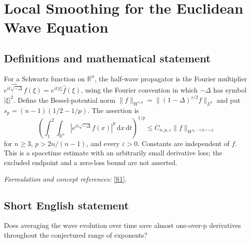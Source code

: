 \documentclass[11pt]{article}
\newcommand{\R}{\mathbb{R}}
\newcommand{\eps}{\varepsilon}
\newcommand{\dd}{\,\mathrm d}
\newcommand{\sref}[2]{\hyperlink{source:#1:#2}{[S#2]}}
\newif\ifshowcatalogue
\newcommand{\cataloguescope}[1]{\ifshowcatalogue
	\paragraph{Exact scope in the supplied catalogue.}
	\begin{quote}\small #1\end{quote}\fi}
\begin{document}
\setcounter{section}{0}
	\clearpage
\section*{\texorpdfstring{Local Smoothing for the Euclidean Wave Equation}{Local Smoothing for the Euclidean Wave Equation}}\label{statement}
	\subsection{Definitions and mathematical statement}
	For a Schwartz function on $\R^n$, the half-wave propagator is the Fourier multiplier
	$\widehat{e^{it\sqrt{-\Delta}}f}(\xi)=e^{it|\xi|}\widehat f(\xi)$, using the Fourier convention in which $-\Delta$ has symbol $|\xi|^2$. Define the Bessel-potential norm
	$\|f\|_{W^{s,p}}=\|(1-\Delta)^{s/2}f\|_{L^p}$ and put $s_p=(n-1)(1/2-1/p)$. The assertion is
	\[
	\left(\int_1^2\int_{\R^n}|e^{it\sqrt{-\Delta}}f(x)|^p\dd x\dd t\right)^{1/p}
	\le C_{n,p,\eps}\|f\|_{W^{s_p-1/p+\eps,p}}
	\]
	for $n\ge3$, $p>2n/(n-1)$, and every $\eps>0$. Constants are independent of $f$. This is a spacetime estimate with an arbitrarily small derivative loss; the excluded endpoint and a zero-loss bound are not asserted.
	\par\smallskip\textit{Formulation and concept references:} \sref{statement}{1}.
	\cataloguescope{For every n >= 3, p > 2n/(n-1), and epsilon > 0, prove ||exp(it sqrt(-Delta))f||\_\{L\textasciicircum{}p(R\textasciicircum{}n x [1,2])\} <= C\_\{p,epsilon\} ||f||\_\{W\textasciicircum{}\{s\_p-1/p+epsilon,p\}(R\textasciicircum{}n)\}, where s\_p=(n-1)(1/2-1/p).}
	\subsection{Short English statement}
	Does averaging the wave evolution over time save almost one-over-p derivatives throughout the conjectured range of exponents?
\end{document}
